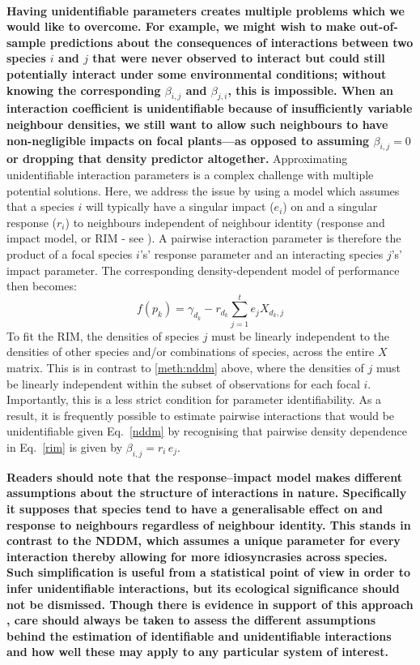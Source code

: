 \documentclass[a4,12pt]{article}
\begin{document}
\begin{refsection}
    \paragraph{}
    {\textbf{Having unidentifiable parameters creates multiple problems which we would like to overcome. For example, we might wish to make out-of-sample predictions about the consequences of interactions between two species $i$ and $j$ that were never observed to interact but could still potentially interact under some environmental conditions; without knowing the corresponding $\beta_{i,j}$ and $\beta_{j,i}$, this is impossible. When an interaction coefficient is unidentifiable because of insufficiently variable neighbour densities, we still want to allow such neighbours to have non-negligible impacts on focal plants---as opposed to assuming $\beta_{i,j} = 0$ or dropping that density predictor altogether.}}
    Approximating unidentifiable interaction parameters is a complex challenge with multiple potential solutions. Here, we address the issue by using a model which assumes that a species $i$ will typically have a singular impact ($e_i$) on and a singular response ($r_i$) to neighbours independent of neighbour identity (response and impact model, or RIM - see \cite{Godoy2014b}). A pairwise interaction parameter is therefore the product of a focal species $i$'s' response parameter and an interacting species $j$'s' impact parameter. The corresponding density-dependent model of performance then becomes:
        \begin{equation}
        f(p_{k}) = \gamma_{d_k} - r_{d_k} \sum_{j=1}^{t} e_{j} X_{d_k, j}
        \label{rim}
        \end{equation}
    To fit the RIM, the densities of species $j$ must be linearly independent to the densities of other species and/or combinations of species, across the entire $X$ matrix. This is in contrast to \ref{meth:nddm} above, where the densities of $j$ must be linearly independent within the subset of observations for each focal $i$. Importantly, this is a less strict condition for parameter identifiability. As a result, it is frequently possible to estimate pairwise interactions that would be unidentifiable given Eq.~\ref{nddm} by recognising that pairwise density dependence in Eq.~\ref{rim} is given by $\beta_{i, j} = r_{i} \, e_{j}$.

    \textbf{Readers should note that the response--impact model makes different assumptions about the structure of interactions in nature. Specifically it supposes that species tend to have a generalisable effect on and response to neighbours regardless of neighbour identity. This stands in contrast to the NDDM, which assumes a unique parameter for every interaction thereby allowing for more idiosyncrasies across species. Such simplification is useful from a statistical point of view in order to infer unidentifiable interactions, but its ecological significance should not be dismissed. Though there is evidence in support of this approach \parencite{Stouffer2022, Skwara2022}, care should always be taken to assess the different assumptions behind the estimation of identifiable and unidentifiable interactions and how well these may apply to any particular system of interest.}


\end{refsection}
\end{document}

